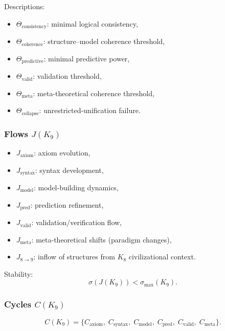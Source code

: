 Descriptions:
\begin{itemize}
    \item $\Theta_{\mathrm{consistency}}$: minimal logical consistency,
    \item $\Theta_{\mathrm{coherence}}$: structure–model coherence threshold,
    \item $\Theta_{\mathrm{predictive}}$: minimal predictive power,
    \item $\Theta_{\mathrm{valid}}$: validation threshold,
    \item $\Theta_{\mathrm{meta}}$: meta-theoretical coherence threshold,
    \item $\Theta_{\mathrm{collapse}}$: unrestricted-unification failure.
\end{itemize}

\subsubsection{Flows \texorpdfstring{$J(K_9)$}{J(K_9)}}

\begin{itemize}
    \item $J_{\mathrm{axiom}}$: axiom evolution,
    \item $J_{\mathrm{syntax}}$: syntax development,
    \item $J_{\mathrm{model}}$: model-building dynamics,
    \item $J_{\mathrm{pred}}$: prediction refinement,
    \item $J_{\mathrm{valid}}$: validation/verification flow,
    \item $J_{\mathrm{meta}}$: meta-theoretical shifts (paradigm changes),
    \item $J_{8\to9}$: inflow of structures from $K_8$ civilizational context.
\end{itemize}

Stability:
\[
\sigma(J(K_9)) < \sigma_{\max}(K_9).
\]

\subsubsection{Cycles \texorpdfstring{$C(K_9)$}{C(K_9)}}

\[
C(K_9)=
\{
C_{\mathrm{axiom}},\;
C_{\mathrm{syntax}},\;
C_{\mathrm{model}},\;
C_{\mathrm{pred}},\;
C_{\mathrm{valid}},\;
C_{\mathrm{meta}}
\}.
\]

